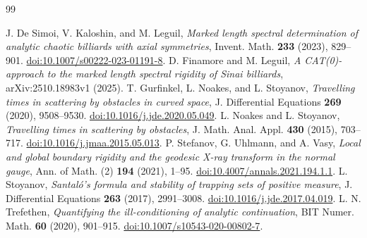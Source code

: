 \begin{thebibliography}{99}
\raggedright
{}
J. De Simoi, V. Kaloshin, and M. Leguil,
\emph{Marked length spectral determination of analytic chaotic billiards
with axial symmetries}, Invent. Math. \textbf{233} (2023), 829--901.
\href{https://doi.org/10.1007/s00222-023-01191-8}{doi:10.1007/s00222-023-01191-8}.
D. Finamore and M. Leguil,
\emph{A CAT(0)-approach to the marked length spectral rigidity of Sinai
billiards}, arXiv:2510.18983v1 (2025).
T. Gurfinkel, L. Noakes, and L. Stoyanov,
\emph{Travelling times in scattering by obstacles in curved space},
J. Differential Equations \textbf{269} (2020), 9508--9530.
\href{https://doi.org/10.1016/j.jde.2020.05.049}{doi:10.1016/j.jde.2020.05.049}.
L. Noakes and L. Stoyanov,
\emph{Travelling times in scattering by obstacles},
J. Math. Anal. Appl. \textbf{430} (2015), 703--717.
\href{https://doi.org/10.1016/j.jmaa.2015.05.013}{doi:10.1016/j.jmaa.2015.05.013}.
P. Stefanov, G. Uhlmann, and A. Vasy,
\emph{Local and global boundary rigidity and the geodesic X-ray transform
in the normal gauge}, Ann. of Math. (2) \textbf{194} (2021), 1--95.
\href{https://doi.org/10.4007/annals.2021.194.1.1}{doi:10.4007/annals.2021.194.1.1}.
L. Stoyanov,
\emph{Santal\'o's formula and stability of trapping sets of positive measure},
J. Differential Equations \textbf{263} (2017), 2991--3008.
\href{https://doi.org/10.1016/j.jde.2017.04.019}{doi:10.1016/j.jde.2017.04.019}.
L. N. Trefethen,
\emph{Quantifying the ill-conditioning of analytic continuation},
BIT Numer. Math. \textbf{60} (2020), 901--915.
\href{https://doi.org/10.1007/s10543-020-00802-7}{doi:10.1007/s10543-020-00802-7}.
\end{thebibliography}
